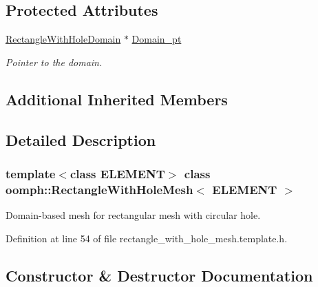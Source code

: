 \subsection*{Protected Attributes}
\begin{DoxyCompactItemize}
\item 
\hyperlink{classoomph_1_1RectangleWithHoleDomain}{Rectangle\+With\+Hole\+Domain} $\ast$ \hyperlink{classoomph_1_1RectangleWithHoleMesh_a04b200644403da650d38e707285e2b53}{Domain\+\_\+pt}
\begin{DoxyCompactList}\small\item\em Pointer to the domain. \end{DoxyCompactList}\end{DoxyCompactItemize}
\subsection*{Additional Inherited Members}


\subsection{Detailed Description}
\subsubsection*{template$<$class E\+L\+E\+M\+E\+NT$>$\newline
class oomph\+::\+Rectangle\+With\+Hole\+Mesh$<$ E\+L\+E\+M\+E\+N\+T $>$}

Domain-\/based mesh for rectangular mesh with circular hole. 

Definition at line 54 of file rectangle\+\_\+with\+\_\+hole\+\_\+mesh.\+template.\+h.



\subsection{Constructor \& Destructor Documentation}
\mbox{\label{classoomph_1_1RectangleWithHoleMesh_aa5080c0cbd60211cafda6f8d77326eae}} 
